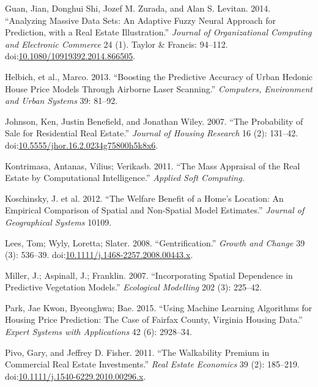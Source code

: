 \documentclass[]{article}
\begin{document}
\hypertarget{ref-Guan2014}{}
Guan, Jian, Donghui Shi, Jozef M. Zurada, and Alan S. Levitan. 2014.
``Analyzing Massive Data Sets: An Adaptive Fuzzy Neural Approach for
Prediction, with a Real Estate Illustration.'' \emph{Journal of
Organizational Computing and Electronic Commerce} 24 (1). Taylor \&
Francis: 94--112.
doi:\href{https://doi.org/10.1080/10919392.2014.866505}{10.1080/10919392.2014.866505}.

\hypertarget{ref-Helbich2013}{}
Helbich, et al., Marco. 2013. ``Boosting the Predictive Accuracy of
Urban Hedonic House Price Models Through Airborne Laser Scanning.''
\emph{Computers, Environment and Urban Systems} 39: 81--92.

\hypertarget{ref-Johnson2007}{}
Johnson, Ken, Justin Benefield, and Jonathan Wiley. 2007. ``The
Probability of Sale for Residential Real Estate.'' \emph{Journal of
Housing Research} 16 (2): 131--42.
doi:\href{https://doi.org/10.5555/jhor.16.2.0234g75800h5k8x6}{10.5555/jhor.16.2.0234g75800h5k8x6}.

\hypertarget{ref-Kontrimasa2011}{}
Kontrimasa, Antanas, Vilius; Verikasb. 2011. ``The Mass Appraisal of the
Real Estate by Computational Intelligence.'' \emph{Applied Soft
Computing}.

\hypertarget{ref-Koschinsky2012}{}
Koschinsky, J. et al. 2012. ``The Welfare Benefit of a Home's Location:
An Empirical Comparison of Spatial and Non-Spatial Model Estimates.''
\emph{Journal of Geographical Systems} 10109.

\hypertarget{ref-Lees2008}{}
Lees, Tom; Wyly, Loretta; Slater. 2008. ``Gentrification.'' \emph{Growth
and Change} 39 (3): 536--39.
doi:\href{https://doi.org/10.1111/j.1468-2257.2008.00443.x}{10.1111/j.1468-2257.2008.00443.x}.

\hypertarget{ref-Miller2015}{}
Miller, J.; Aspinall, J.; Franklin. 2007. ``Incorporating Spatial
Dependence in Predictive Vegetation Models.'' \emph{Ecological
Modelling} 202 (3): 225--42.

\hypertarget{ref-Park2015}{}
Park, Jae Kwon, Byeonghwa; Bae. 2015. ``Using Machine Learning
Algorithms for Housing Price Prediction: The Case of Fairfax County,
Virginia Housing Data.'' \emph{Expert Systems with Applications} 42 (6):
2928--34.

\hypertarget{ref-Pivo2011}{}
Pivo, Gary, and Jeffrey D. Fisher. 2011. ``The Walkability Premium in
Commercial Real Estate Investments.'' \emph{Real Estate Economics} 39
(2): 185--219.
doi:\href{https://doi.org/10.1111/j.1540-6229.2010.00296.x}{10.1111/j.1540-6229.2010.00296.x}.
\end{document}
